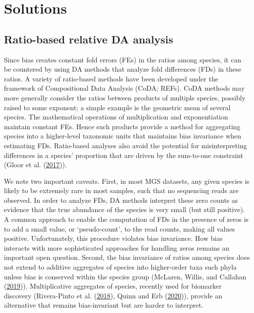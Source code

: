 \documentclass[
]{article}
\begin{document}
\hypertarget{solutions}{%
\section{Solutions}\label{solutions}}

\hypertarget{ratio-based-relative-da-analysis}{%
\subsection{Ratio-based relative DA analysis}\label{ratio-based-relative-da-analysis}}

Since bias creates constant fold errors (FEs) in the ratios among species, it can be countered by using DA methods that analyze fold differences (FDs) in these ratios.
A variety of ratio-based methods have been developed under the framework of Compositional Data Analysis (CoDA; REFs).
CoDA methods may more generally consider the ratios between products of multiple species, possibly raised to some exponent; a simple example is the geometric mean of several species.
The mathematical operations of multiplication and exponentiation maintain constant FEs.
Hence such products provide a method for aggregating species into a higher-level taxonomic units that maintains bias invariance when estimating FDs.
Ratio-based analyses also avoid the potential for misinterpreting differences in a species' proportion that are driven by the sum-to-one constraint (Gloor et al. (\protect\hyperlink{ref-gloor2017micr}{2017})).

We note two important caveats.
First, in most MGS datasets, any given species is likely to be extremely rare in most samples, such that no sequencing reads are observed.
In order to analyze FDs, DA methods interpret these zero counts as evidence that the true abundance of the species is very small (but still positive).
A common approach to enable the computation of FDs in the presence of zeros is to add a small value, or `pseudo-count', to the read counts, making all values positive.
Unfortunately, this procedure violates bias invariance.
How bias interacts with more sophisticated approaches for handling zeros remains an important open question.
Second, the bias invariance of ratios among species does not extend to additive aggregates of species into higher-order taxa such phyla unless bias is conserved within the species group (McLaren, Willis, and Callahan (\protect\hyperlink{ref-mclaren2019cons}{2019})).
Multiplicative aggregates of species, recently used for biomarker discovery (Rivera-Pinto et al. (\protect\hyperlink{ref-riverapinto2018bala}{2018}), Quinn and Erb (\protect\hyperlink{ref-quinn2020inte}{2020})), provide an alternative that remains bias-invariant but are harder to interpret.
\end{document}
